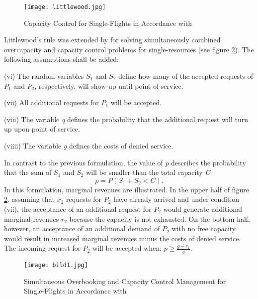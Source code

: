 \begin{figure}[h!]
	\begin{center}
		\texttt{[image: littlewood.jpg]}
		\label{littlewood}
		\caption{Capacity Control for Single-Flights in Accordance with \citet[p.162]{klein2008}} 
	\end{center}
\end{figure}	

Littlewood's rule was extended by \citet[p.176 ff.]{bodily1995} for solving simultaneously combined overcapacity and capacity control problems for single-resources (see figure \ref{littlewood1}). The following assumptions shall be added:
\begin{description}
	\item(vi) The random variables $S_{1}$ and $S_{2}$ define how many of the accepted requests of $P_{1}$ and $P_{2}$, respectively, will show-up until point of service.
	\item(vii)\label{vii_} All additional requests for $P_{1}$ will be accepted.
	\item(viii) The variable \textit{q} defines the probability that the additional request will turn up upon point of service.
	\item(viiii) The variable \textit{g} defines the costs of denied service.
\end{description}
In contrast to the previous formulation, the value of \textit{p} describes the probability that the sum of $S_{1}$ and $S_{2}$ will be smaller than the total capacity \textit{C}:
\begin{equation}
p=P(S_{1}+S_{2}<C).
\end{equation}
In this formulation, marginal revenues are illustrated. In the upper half of figure \ref{littlewood1}, assuming that $x_{2}$ requests for $P_{2}$ have already arrived and under condition (vii), the acceptance of an additional request for $P_{2}$ would generate additional marginal revenues $r_{2}$ because the capacity is not exhausted. On the bottom half, however, an acceptance of an additional demand of $P_{2}$ with no free capacity would result in increased marginal revenues minus the costs of denied service. The incoming request for $P_{2}$ will be accepted when: $p\geq\frac{g-r_{2}}{g}$\cite{bodily}.

\begin{figure}[h]
	\begin{center}
		\texttt{[image: bild1.jpg]}
		\label{littlewood1}
		\caption{Simultaneous Overbooking and Capacity Control Management for Single-Flights in Accordance with \citet[p.163]{klein2008}} 
	\end{center}
\end{figure}

